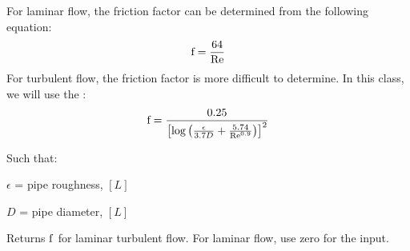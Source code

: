 \documentclass[letterpaper,10pt,english]{sphinxmanual}
\begin{document}
For laminar flow, the friction factor can be determined from the following equation:
\begin{equation}\label{equation:Review/Review_Fluid_Mechanics:Review/Review_Fluid_Mechanics:6}
\begin{split}{\rm{f}} = \frac{64}{\rm{Re}}\end{split}
\end{equation}
For turbulent flow, the friction factor is more difficult to determine. In this class, we will use the :
\begin{equation}\label{equation:Review/Review_Fluid_Mechanics:swamee_jain}
\begin{split}  {\rm{f}} = \frac{0.25} {\left[ \log \left( \frac{\epsilon }{3.7D} + \frac{5.74}{{\rm Re}^{0.9}} \right) \right]^2}\end{split}
\end{equation}
\begin{DUlineblock}{0em}
\item[] Such that:
\item[] \(\epsilon\) = pipe roughness, \([L]\)
\item[] \(D\) = pipe diameter, \([L]\)
\end{DUlineblock}




  Returns \(\rm{f}\) for laminar  turbulent flow. For laminar flow, use zero for the  input.
\end{document}
